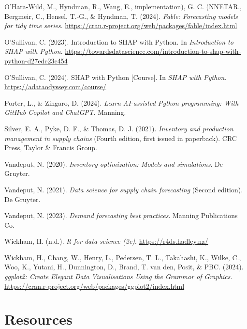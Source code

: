 \documentclass[
  american,
  10,
  a4paper,
]{book}
\newlength{\cslhangindent}
\newenvironment{CSLReferences}[2] %
 {\begin{list}{}{%
  \setlength{\itemindent}{0pt}
  \setlength{\leftmargin}{0pt}
  \setlength{\parsep}{0pt}
  \ifodd #1
   \setlength{\leftmargin}{\cslhangindent}
   \setlength{\itemindent}{-1\cslhangindent}
  \fi
  \setlength{\itemsep}{#2\baselineskip}}}
 {\end{list}}
\theoremstyle{definition}
\theoremstyle{remark}
\begin{document}
\begin{CSLReferences}{1}{0}
O'Hara-Wild, M., Hyndman, R., Wang, E., implementation), G. C. (NNETAR.,
Bergmeir, C., Hensel, T.-G., \& Hyndman, T. (2024). \emph{Fable:
Forecasting models for tidy time series}.
\url{https://cran.r-project.org/web/packages/fable/index.html}

O'Sullivan, C. (2023). Introduction to {SHAP} with {Python}. In
\emph{Introduction to SHAP with Python}.
\url{https://towardsdatascience.com/introduction-to-shap-with-python-d27edc23c454}

O'Sullivan, C. (2024). {SHAP} with {Python} {[}Course{]}. In \emph{SHAP
with Python}. \url{https://adataodyssey.com/course/}

Porter, L., \& Zingaro, D. (2024). \emph{Learn {AI}-assisted {Python}
programming: With {GitHub} {Copilot} and {ChatGPT}}. Manning.

Silver, E. A., Pyke, D. F., \& Thomas, D. J. (2021). \emph{Inventory and
production management in supply chains} (Fourth edition, first issued in
paperback). CRC Press, Taylor \& Francis Group.

Vandeput, N. (2020). \emph{Inventory optimization: Models and
simulations}. De Gruyter.

Vandeput, N. (2021). \emph{Data science for supply chain forecasting}
(Second edition). De Gruyter.

Vandeput, N. (2023). \emph{Demand forecasting best practices}. Manning
Publications Co.

Wickham, H. (n.d.). \emph{R for data science (2e)}.
\url{https://r4ds.hadley.nz/}

Wickham, H., Chang, W., Henry, L., Pedersen, T. L., Takahashi, K.,
Wilke, C., Woo, K., Yutani, H., Dunnington, D., Brand, T. van den,
Posit, \& PBC. (2024). \emph{ggplot2: {Create} {Elegant} {Data}
{Visualisations} {Using} the {Grammar} of {Graphics}}.
\url{https://cran.r-project.org/web/packages/ggplot2/index.html}

\end{CSLReferences}

\chapter{Resources}\label{resources}
\end{document}

